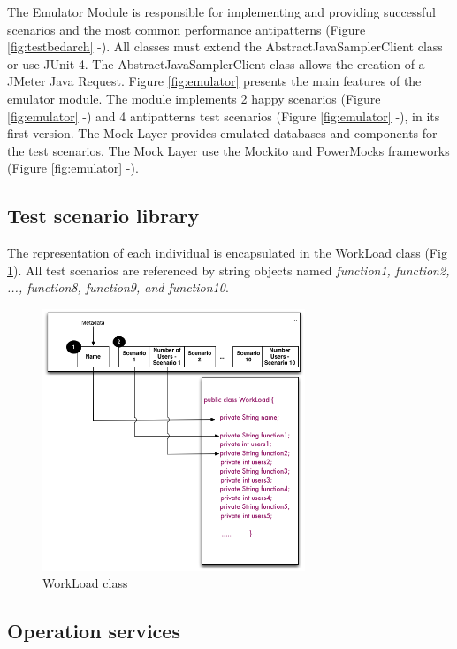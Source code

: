 \documentclass{report}
\begin{document}
The Emulator Module is responsible for implementing and providing successful scenarios and the most common performance antipatterns (Figure \ref{fig:testbedarch}  -). All classes must extend the AbstractJavaSamplerClient class or use JUnit 4. The AbstractJavaSamplerClient class allows the creation of a JMeter Java Request. Figure \ref{fig:emulator} presents the main features of the emulator module. The module implements 2 happy scenarios (Figure \ref{fig:emulator}  -) and  4 antipatterns test scenarios (Figure \ref{fig:emulator}  -), in its first version. The Mock Layer provides emulated databases and components for the test scenarios. The Mock Layer use the Mockito and PowerMocks frameworks (Figure \ref{fig:emulator}  -).

\subsection{Test scenario library}

The representation of each individual is encapsulated in the WorkLoad class (Fig \ref{fig:genomeimpl}). All test scenarios are referenced by string objects named \textit{function1, function2, ..., function8, function9, and function10}.


\begin{figure}[!h]
\centering
\includegraphics[width=0.7\textwidth]{./images/genomeimpl.png}
\caption{WorkLoad class}
\label{fig:genomeimpl}
\end{figure}


\subsection{Operation services}
\end{document}
